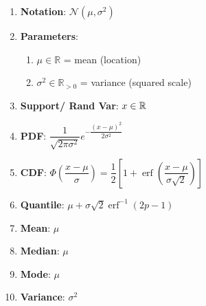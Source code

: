 \begin{enumerate}

    \item 
    \textbf{Notation}:
    $
        {\displaystyle {\mathcal {N}}(\mu ,\sigma ^{2})}
    $
    \hfill \cite{wiki/Normal_distribution} 

    \item 
    \textbf{Parameters}:
    \begin{enumerate}
        \item ${\displaystyle \mu \in \mathbb {R} }$ = mean (location)
        \hfill \cite{wiki/Normal_distribution}

        \item ${\displaystyle \sigma ^{2}\in \mathbb {R} _{>0}}$ = variance (squared scale)
        \hfill \cite{wiki/Normal_distribution}
    \end{enumerate}

    \item 
    \textbf{Support/ Rand Var}: 
    $x \in \mathbb{R}$ 
    \hfill \cite{wiki/Normal_distribution}

    \item 
    \textbf{PDF}: 
    $ {\displaystyle {\dfrac {1}{\sqrt {2\pi \sigma ^{2}}}}e^{-{\dfrac {(x-\mu )^{2}}{2\sigma ^{2}}}}} $ 
    \hfill\cite{wiki/Normal_distribution}

    \item 
    \textbf{CDF}: 
    $ {\displaystyle \Phi \left({\dfrac {x-\mu }{\sigma }}\right)={\dfrac {1}{2}}\left[1+\operatorname {erf} \left({\dfrac {x-\mu }{\sigma {\sqrt {2}}}}\right)\right]} $ 
    \hfill\cite{wiki/Normal_distribution}

    \item 
    \textbf{Quantile}:
    $ {\displaystyle \mu +\sigma {\sqrt {2}}\operatorname {erf} ^{-1}(2p-1)} $ 
    \hfill\cite{wiki/Normal_distribution}

    \item 
    \textbf{Mean}:
    $ {\displaystyle \mu } $ 
    \hfill\cite{wiki/Normal_distribution}

    \item 
    \textbf{Median}:
    $ {\displaystyle \mu } $ 
    \hfill\cite{wiki/Normal_distribution}

    \item 
    \textbf{Mode}:
    $ {\displaystyle \mu } $ 
    \hfill\cite{wiki/Normal_distribution}

    \item 
    \textbf{Variance}:
    $ {\displaystyle \sigma ^{2}} $
    \hfill\cite{wiki/Normal_distribution}


\end{enumerate}
